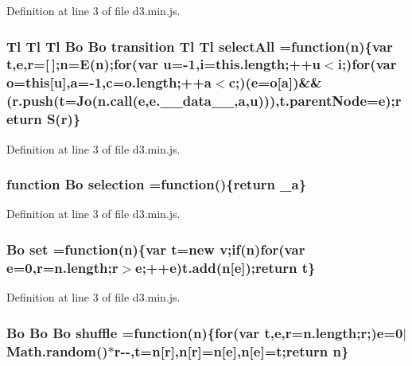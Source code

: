 Definition at line 3 of file d3.\+min.\+js.

\subsubsection[{select\+All}]{ {\bf Tl} {\bf Tl} {\bf Tl} {\bf Bo} {\bf Bo} {\bf transition} {\bf Tl} {\bf Tl} select\+All =function({\bf n})\{var t,{\bf e},{\bf r}=[$\,$];{\bf n}=E({\bf n});{\bf for}(var u=-\/1,{\bf i}=this.\+length;++u$<${\bf i};){\bf for}(var {\bf o}={\bf this}[u],{\bf a}=-\/1,{\bf c}=o.\+length;++{\bf a}$<${\bf c};)({\bf e}={\bf o}[{\bf a}])\&\&(r.\+push(t={\bf Jo}({\bf n.\+call}({\bf e},e.\+\_\+\+\_\+data\+\_\+\+\_\+,{\bf a},u))),t.\+parent\+Node={\bf e});{\bf return} S({\bf r})\}}\label{d3_8min_8js_a021de6edf97b893b39f0407b3cc86955}


Definition at line 3 of file d3.\+min.\+js.

\subsubsection[{selection}]{\setlength{\rightskip}{0pt plus 5cm}function {\bf Bo} selection =function()\{{\bf return} {\bf \+\_\+a}\}}\label{d3_8min_8js_a7f53e1e65015d7e9dc5d60043eb94afc}


Definition at line 3 of file d3.\+min.\+js.

\subsubsection[{set}]{ {\bf Bo} set =function({\bf n})\{var t=new v;{\bf if}({\bf n}){\bf for}(var {\bf e}=0,{\bf r}=n.\+length;{\bf r}$>${\bf e};++{\bf e})t.\+add({\bf n}[{\bf e}]);{\bf return} t\}}\label{d3_8min_8js_a51124d0a5ab5fe96b3efbb06b55cb3fa}


Definition at line 3 of file d3.\+min.\+js.

\subsubsection[{shuffle}]{ {\bf Bo} {\bf Bo} {\bf Bo} shuffle =function({\bf n})\{{\bf for}(var t,{\bf e},{\bf r}=n.\+length;{\bf r};){\bf e}=0$\vert${\bf Math.\+random}()$\ast${\bf r}-\/-\/,t={\bf n}[{\bf r}],{\bf n}[{\bf r}]={\bf n}[{\bf e}],{\bf n}[{\bf e}]=t;{\bf return} {\bf n}\}}\label{d3_8min_8js_a3eb96ea6ac1816b968c255b632c3892b}


